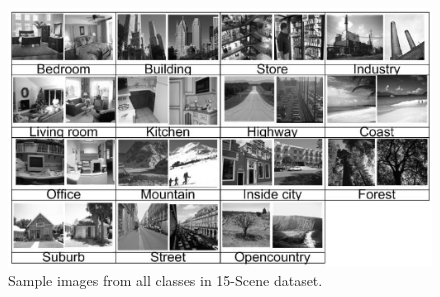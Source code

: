\documentclass[12pt,oneside,geqno]{article}
\begin{document}
\begin{Problem}[b]
		\begin{figure}
			\centering
			\includegraphics[width=\textwidth]{../figs/q2_classes.png}
			\caption{Sample images from all classes in 15-Scene dataset.}
			\label{img:q2_classes}
		\end{figure}
	\end{Problem}
	
\end{document}
